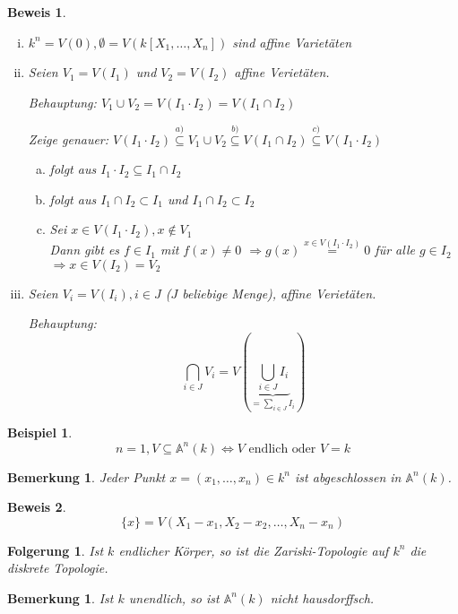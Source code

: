 \documentclass[a4paper, 12pt, numbers=noendperiod, chapterprefix=true, headsepline]{scrbook}
\theoremstyle{break}
\newtheorem{Bem}[Def]{Bemerkung}
\newtheorem{Folg}[Def]{Folgerung}
\newtheorem{Bsp}[Def]{Beispiel}
\theoremstyle{nonumberbreak}
\newtheorem{Bew}{Beweis}
\theoremstyle{nonumberplain}
\newcommand{\A}{\mathbb{A}}
\begin{document}
\begin{Bew}\begin{enumerate}[i)]
\item
	$k^n=V(0), \emptyset=V(k[X_1,\dots ,X_n])$ sind affine Variet\"aten
\item
	Seien $V_1=V(I_1)$ und $V_2 =V(I_2)$ affine Veriet\"aten.
	
	\emph{Behauptung:} $V_1 \cup V_2 =V(I_1\cdot I_2)=V(I_1\cap I_2)$
	
	Zeige genauer: $V(I_1\cdot I_2) \overset{a)}{\subseteq} V_1 \cup V_2 \overset{b)}{\subseteq} V(I_1\cap I_2) \overset{c)}{\subseteq} V(I_1\cdot I_2)$
	\begin{enumerate}[a)]
	\item[c)] folgt aus $I_1\cdot I_2 \subseteq I_1 \cap I_2$
	\item[b)] folgt aus $I_1 \cap I_2 \subset I_1$ und $I_1 \cap I_2 \subset I_2$
	\item[a)] Sei $x\in V(I_1\cdot I_2), x\notin V_1$\\
		Dann gibt es $f\in I_1$ mit $f(x) \not= 0$ $\Rightarrow  g(x) \stackrel{x\in V(I_1\cdot I_2)}= 0$ f\"ur alle $g\in I_2$ 	$\Rightarrow x\in V(I_2) = V_2$
	\end{enumerate}
\item
	Seien $V_i = V(I_i),i \in J$ ($J$ beliebige Menge), affine Veriet\"aten.
	
	\emph{Behauptung:} \[ \bigcap_{i\in J} V_i = V(\underbrace{\bigcup_{i\in J} I_i}_{= \sum_{i\in J} I_i}) \]
\end{enumerate}\end{Bew}

\begin{Bsp}\[
	n = 1, V \subseteq \A ^n(k) \Leftrightarrow V \textrm{ endlich oder } V=k
\]\end{Bsp}

\begin{Bem}
Jeder Punkt $x=(x_1,\dots ,x_n)\in k^n$ ist abgeschlossen in $\A ^n(k)$.
\end{Bem}

\begin{Bew}\[
\{x\}= V(X_1-x_1,X_2-x_2,\dots ,X_n-x_n)
\]\end{Bew}

\begin{Folg}
Ist $k$ endlicher K\"orper, so ist die Zariski-Topologie auf $k^n$ die diskrete Topologie.
\end{Folg}

\begin{Bem}
Ist $k$ unendlich, so ist $\A ^n(k)$ nicht hausdorffsch.
\end{Bem}
\end{document}
